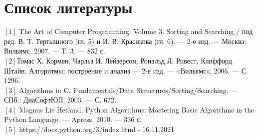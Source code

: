 %
\chapter{Список литературы}
\noindent$[1]$ The Art of Computer Programming. Volume 3. Sorting and Searching / под ред. В. Т. Тертышного (гл. 5) и И. В. Красикова (гл. 6). — 2-е изд. — Москва: Вильямс, 2007. — Т. 3. — 832 с.\\
$[2]$Томас Х. Кормен, Чарльз И. Лейзерсон, Рональд Л. Ривест, Клиффорд Штайн. Алгоритмы: построение и анализ — 2-е изд. —  «Вильямс», 2006. — С. 1296.\\
$[3]$ Algorithms in C. Fundamentals/Data Structures/Sorting/Searching. — СПб.: ДиаСофтЮП, 2003. — С. 672.\\
$[4]$ Magnus Lie Hetland. Python Algorithms: Mastering Basic Algorithms in the Python Language. — Apress, 2010. — 336 с.\\
$[5]$ https://docs.python.org/3/index.html - 16.11.2021\\